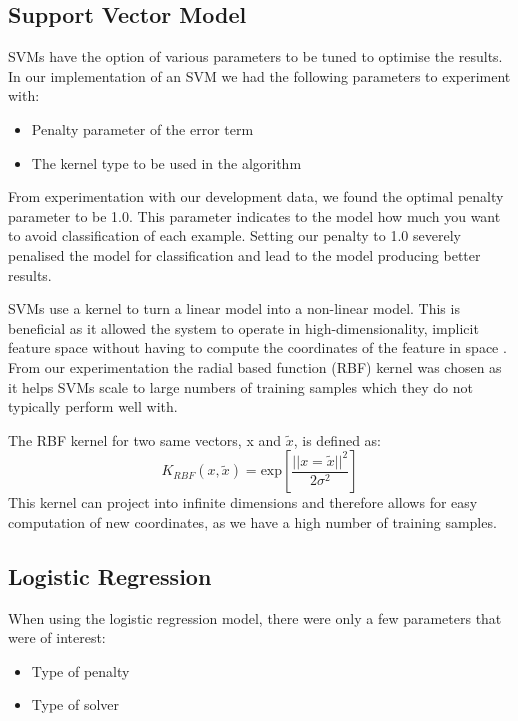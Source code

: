\documentclass[bsc,frontabs,twoside,singlespacing,parskip,deptreport]{infthesis}     %
\begin{document}
 \subsection{Support Vector Model}
 SVMs have the option of various parameters to be tuned to optimise the results.
 In our implementation of an SVM we had the following parameters to experiment with:
 \begin{itemize}
 \item Penalty parameter of the error term
 \item The kernel type to be used in the algorithm
 \end{itemize}

 From experimentation with our development data, we found the optimal penalty parameter to be 1.0.
 This parameter indicates to the model how much you want to avoid classification of each example.
 Setting our penalty to 1.0 severely penalised the model for classification and lead to the model producing
 better results.

 SVMs use a kernel to turn a linear model into a non-linear model. This is beneficial as it allowed the system
 to operate in high-dimensionality, implicit feature space without having to compute the coordinates of the feature
 in space \cite{hofmann2008kernel}.
 From our experimentation the radial based function (RBF) kernel was chosen as it helps SVMs scale to large numbers of
 training samples which they do not typically perform well with.

 The RBF kernel for two same vectors, x and $\tilde{x}$, is defined as:
 \begin{equation}
   K_{RBF} (x, \tilde{x}) = \text{exp}[ \frac{||x =\tilde{x}||^2}{2\sigma^2}]\nonumber
 \end{equation}
\cite{hofmann2008kernel}
 This kernel can project into infinite dimensions and therefore allows for easy computation of new coordinates, as
 we have a high number of training samples.
 
 \subsection{Logistic Regression}\label{sec:log-reg}
 When using the logistic regression model, there were only a few parameters that were of interest:
 \begin{itemize}
   \item Type of penalty
   \item Type of solver
 \end{itemize}
\end{document}
